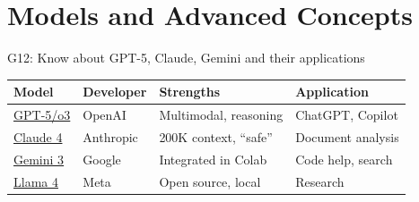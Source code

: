 \documentclass[aspectratio=169, 10pt]{beamer}
\begin{document}
\section{Models and Advanced Concepts}

\begin{frame}{G12: Know about GPT-5, Claude, Gemini and their applications}
    \begin{center}
        \scriptsize
        \begin{tabular}{lp{3cm}p{3.5cm}p{2.5cm}}
            \toprule
            \textbf{Model} & \textbf{Developer} & \textbf{Strengths} & \textbf{Application} \\
            \midrule
            \href{https://openai.com/gpt-5}{GPT-5/o3} & OpenAI & Multimodal, reasoning & ChatGPT, Copilot \\
            \href{https://www.anthropic.com/claude}{Claude 4} & Anthropic & 200K context, ``safe'' & Document analysis \\
            \href{https://deepmind.google/gemini}{Gemini 3} & Google & Integrated in Colab & Code help, search \\
            \href{https://llama.meta.com/}{Llama 4} & Meta & Open source, local & Research \\
            \bottomrule
        \end{tabular}
    \end{center}


\end{frame}
\end{document}
